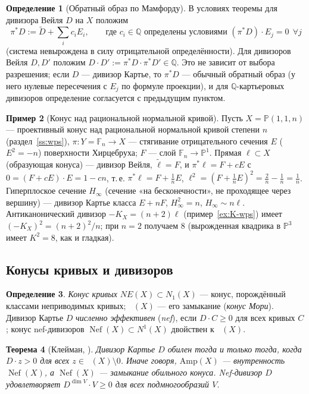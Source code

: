 \documentclass[11pt,a4paper]{article}
\theoremstyle{plain}
\newtheorem{theorem}{Теорема}[section]
\theoremstyle{definition}
\newtheorem{definition}[theorem]{Определение}
\newtheorem{example}[theorem]{Пример}
\theoremstyle{remark}
\newcommand{\Q}{\mathbb{Q}}
\newcommand{\PP}{\mathbb{P}}
\DeclareMathOperator{\NE}{\overline{NE}}
\DeclareMathOperator{\Nef}{Nef}
\begin{document}
\begin{definition}[Обратный образ по Мамфорду]\label{def:mumford-pullback}
В условиях теоремы для дивизора Вейля $D$ на $X$ положим
\[
\pi^*D:=\tilde D+\sum_ic_iE_i,\qquad\text{где } c_i\in\Q \text{ определены условиями }
(\pi^*D)\cdot E_j=0\ \ \forall j
\]
(система невырождена в силу отрицательной определённости). Для дивизоров Вейля $D,D'$ положим
$D\cdot D':=\pi^*D\cdot\pi^*D'\in\Q$. Это не зависит от выбора разрешения; если $D$ --- дивизор
Картье, то $\pi^*D$ --- обычный обратный образ (у него нулевые пересечения с $E_j$ по формуле
проекции), и для $\Q$-картьеровых дивизоров определение согласуется с предыдущим пунктом.
\end{definition}

\begin{example}[Конус над рациональной нормальной кривой]\label{ex:P11n-intersections}
Пусть $X=\PP(1,1,n)$ --- проективный конус над рациональной нормальной кривой степени $n$
(раздел~\ref{ss:wps}), $\pi\colon Y=\mathbb F_n\to X$ --- стягивание отрицательного сечения
$E$ ($E^2=-n$) поверхности Хирцебруха; $F$ --- слой $\mathbb F_n\to\PP^1$. Прямая $\ell\subset X$
(образующая конуса) --- дивизор Вейля, $\tilde\ell=F$, и $\pi^*\ell=F+cE$ с
$0=(F+cE)\cdot E=1-cn$, т.\,е. $\pi^*\ell=F+\frac1nE$, $\ell^2=(F+\frac1nE)^2=\frac2n-\frac1n=\frac1n$.
Гиперплоское сечение $H_\infty$ (сечение «на бесконечности», не проходящее через вершину) ---
дивизор Картье класса $E+nF$, $H_\infty^2=n$, $H_\infty\sim n\ell$. Антиканонический дивизор
$-K_X=(n+2)\ell$ (пример~\ref{ex:K-wps}) имеет $(-K_X)^2=(n+2)^2/n$; при $n=2$ получаем $8$
(вырожденная квадрика в $\PP^3$ имеет $K^2=8$, как и гладкая).
\end{example}

\subsection{Конусы кривых и дивизоров}

\begin{definition}
\emph{Конус кривых} $NE(X)\subset N_1(X)$ --- конус, порождённый классами неприводимых кривых;
$\NE(X)$ --- его замыкание (\emph{конус Мори}). Дивизор Картье $D$ \emph{численно эффективен}
(\emph{nef}), если $D\cdot C\ge0$ для всех кривых $C$; конус nef-дивизоров $\Nef(X)\subset N^1(X)$
двойствен к $\NE(X)$.
\end{definition}

\begin{theorem}[{Клейман, \cite[1.4.23]{La}}]\label{thm:Kleiman}
Дивизор Картье $D$ обилен тогда и только тогда, когда $D\cdot z>0$ для всех $z\in\NE(X)\setminus0$.
Иначе говоря, $\mathrm{Amp}(X)$ --- внутренность $\Nef(X)$, а $\Nef(X)$ --- замыкание обильного
конуса. Nef-дивизор $D$ удовлетворяет $D^{\dim V}\cdot V\ge0$ для всех подмногообразий $V$.
\end{theorem}
\end{document}
